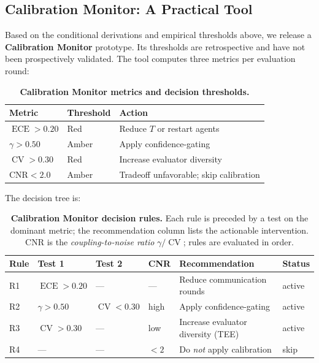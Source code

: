 \documentclass[11pt]{article}
\DeclareMathOperator{\CV}{CV}
\DeclareMathOperator{\ECE}{ECE}
\begin{document}
\subsection{Calibration Monitor: A Practical Tool}

Based on the conditional derivations and empirical thresholds above, we release a \textbf{Calibration Monitor} prototype. Its thresholds are retrospective and have not been prospectively validated. The tool computes three metrics per evaluation round:

\begin{table}[H]
\centering
\caption{\textbf{Calibration Monitor metrics and decision thresholds.}}
\begin{tabular}{@{}lll@{}}
\toprule
Metric & Threshold & Action \\
\midrule
$\ECE > 0.20$ & Red & Reduce $T$ or restart agents \\
$\gamma > 0.50$ & Amber & Apply confidence-gating \\
$\CV > 0.30$ & Red & Increase evaluator diversity \\
$\text{CNR} < 2.0$ & Amber & Tradeoff unfavorable; skip calibration \\
\bottomrule
\end{tabular}
\end{table}

The decision tree is:

\begin{table}[t]
\centering
\caption{\textbf{Calibration Monitor decision rules.} Each rule is preceded by a test on the dominant metric; the recommendation column lists the actionable intervention. CNR is the \textit{coupling-to-noise ratio} $\gamma / \CV$; rules are evaluated in order.}
\label{tab:monitor}
\small
\begin{tabular}{@{}p{2.2cm}p{2.0cm}p{2.0cm}p{2.0cm}p{3.6cm}p{2.4cm}@{}}
\toprule
\textbf{Rule} & \textbf{Test 1} & \textbf{Test 2} & \textbf{CNR} & \textbf{Recommendation} & \textbf{Status} \\
\midrule
R1 & $\ECE > 0.20$ & --- & --- & Reduce communication rounds               & active \\
R2 & $\gamma > 0.50$ & $\CV < 0.30$ & high & Apply confidence-gating                 & active \\
R3 & $\CV > 0.30$    & ---          & low  & Increase evaluator diversity (TEE)     & active \\
R4 & ---             & ---          & $<2$ & Do \emph{not} apply calibration         & skip   \\
\bottomrule
\end{tabular}
\end{table}
\end{document}
